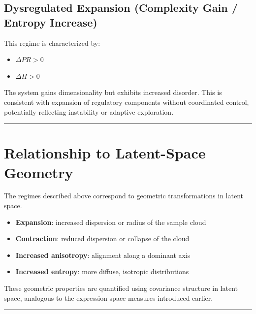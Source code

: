 \documentclass[
  letterpaper,
  DIV=11,
  numbers=noendperiod,
  openany,
  oneside]{scrreprt}
\providecommand{\tightlist}{%
  \setlength{\itemsep}{0pt}\setlength{\parskip}{0pt}}
\begin{document}
\subsection{Dysregulated Expansion (Complexity Gain / Entropy
Increase)}\label{dysregulated-expansion-complexity-gain-entropy-increase}

This regime is characterized by:

\begin{itemize}
\tightlist
\item
  \(\Delta PR > 0\)\\
\item
  \(\Delta H > 0\)
\end{itemize}

The system gains dimensionality but exhibits increased disorder. This is
consistent with expansion of regulatory components without coordinated
control, potentially reflecting instability or adaptive exploration.

\begin{center}\rule{0.5\linewidth}{0.5pt}\end{center}

\section{Relationship to Latent-Space
Geometry}\label{relationship-to-latent-space-geometry}

The regimes described above correspond to geometric transformations in
latent space.

\begin{itemize}
\tightlist
\item
  \textbf{Expansion}: increased dispersion or radius of the sample
  cloud\\
\item
  \textbf{Contraction}: reduced dispersion or collapse of the cloud\\
\item
  \textbf{Increased anisotropy}: alignment along a dominant axis\\
\item
  \textbf{Increased entropy}: more diffuse, isotropic distributions
\end{itemize}

These geometric properties are quantified using covariance structure in
latent space, analogous to the expression-space measures introduced
earlier.

\begin{center}\rule{0.5\linewidth}{0.5pt}\end{center}
\end{document}
